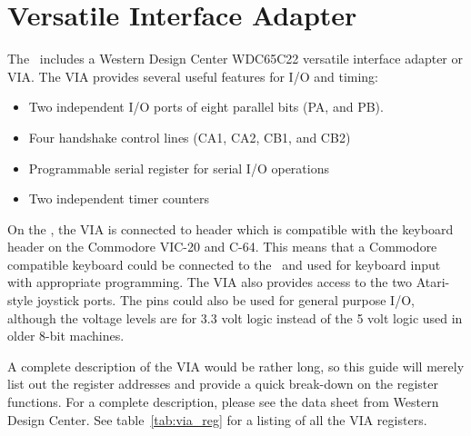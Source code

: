 \chapter{Versatile Interface Adapter}

The \jr\ includes a Western Design Center WDC65C22 versatile interface adapter or VIA. The VIA provides several useful features for I/O and timing:

\begin{itemize}
    \item Two independent I/O ports of eight parallel bits (PA, and PB).

    \item Four handshake control lines (CA1, CA2, CB1, and CB2)

    \item Programmable serial register for serial I/O operations

    \item Two independent timer counters
\end{itemize}

On the \jr, the VIA is connected to header which is compatible with the keyboard header on the Commodore VIC-20 and C-64. This means that a Commodore compatible keyboard could be connected to the \jr\ and used for keyboard input with appropriate programming. The VIA also provides access to the two Atari-style joystick ports. The pins could also be used for general purpose I/O, although the voltage levels are for 3.3 volt logic instead of the 5 volt logic used in older 8-bit machines.

A complete description of the VIA would be rather long, so this guide will merely list out the register addresses and provide a quick break-down on the register functions. For a complete description, please see the data sheet from Western Design Center. See table~\ref{tab:via_reg} for a listing of all the VIA registers.

